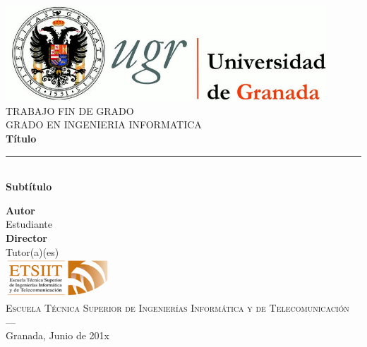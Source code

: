 \begin{titlepage}
    \newlength{\centeroffset}
    \setlength{\centeroffset}{-0.5\oddsidemargin}
    \addtolength{\centeroffset}{0.5\evensidemargin}
    \thispagestyle{empty}
    
    \noindent\hspace*{\centeroffset}\begin{minipage}{\textwidth}
    
    \centering
    \includegraphics[width=0.9\textwidth]{logos/logo_ugr.jpg}\\[1.4cm]
    
    \textsc{ \Large TRABAJO FIN DE GRADO\\[0.2cm]}
    \textsc{ GRADO EN INGENIERIA INFORMATICA}\\[1cm]
    
    {\Huge\bfseries Título \\}
    \noindent\rule[-1ex]{\textwidth}{3pt}\\[3.5ex]
    {\large\bfseries Subtítulo }
    \end{minipage}
    
    \vspace{2.5cm}
    \noindent\hspace*{\centeroffset}
    \begin{minipage}{\textwidth}
    \centering
    
    \textbf{Autor}\\ {Estudiante}\\[2.5ex]
    \textbf{Director}\\ {Tutor(a)(es)}\\[2cm]
    \includegraphics[width=0.3\textwidth]{logos/etsiit_logo.png}\\[0.1cm]
    \textsc{Escuela Técnica Superior de Ingenierías Informática y de Telecomunicación}\\
    \textsc{---}\\
    Granada, Junio de 201x
    \end{minipage}
    \end{titlepage}